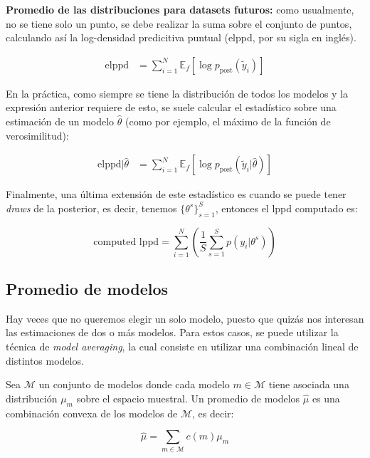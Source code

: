 \textbf{Promedio de las distribuciones para datasets futuros:} como usualmente, no se tiene solo un punto, se debe realizar la suma sobre el conjunto de puntos, calculando así la log-densidad predicitiva puntual (elppd, por su sigla en inglés).

\begin{align}
\text{elppd} & = \sum_{i=1}^N \mathbb{E}_f[\log p_{\text{post}}(\tilde{y}_i)]
\end{align}

En la práctica, como siempre se tiene la distribución de todos los modelos y la expresión anterior requiere de esto, se suele calcular el estadístico sobre una estimación de un modelo $\hat{\theta}$ (como por ejemplo, el máximo de la función de verosimilitud):

\begin{align}
\text{elppd}|\hat{\theta} & = \sum_{i=1}^N \mathbb{E}_f[\log p_{\text{post}}(\tilde{y}_i|\hat{\theta})]
\end{align}

Finalmente, una última extensión de este estadístico es cuando se puede tener \emph{draws} de la posterior, es decir, tenemos $\{ \theta^s\}_{s=1}^S$, entonces el lppd computado es:

\begin{equation}
\text{computed lppd} = \sum_{i=1}^N \left( \frac{1}{S} \sum_{s=1}^S p(y_i|\theta^s)\right)
\end{equation}


\subsection{Promedio de modelos}
Hay veces que no queremos elegir un solo modelo, puesto que quizás nos interesan las estimaciones de dos o más modelos. Para estos casos, se puede utilizar la técnica de \emph{model averaging}, la cual consiste en utilizar una combinación lineal de distintos modelos.\\

\newpage

Sea $\mathcal{M}$ un conjunto de modelos donde cada modelo $m\in\mathcal{M}$ tiene asociada una distribución $\mu_m$ sobre el espacio muestral. Un promedio de modelos $\hat{\mu}$ es una combinación convexa de los modelos de $\mathcal{M}$, es decir:

\begin{equation}
\hat{\mu} = \sum_{m\in \mathcal{M}} c(m) \mu_m
\end{equation}


